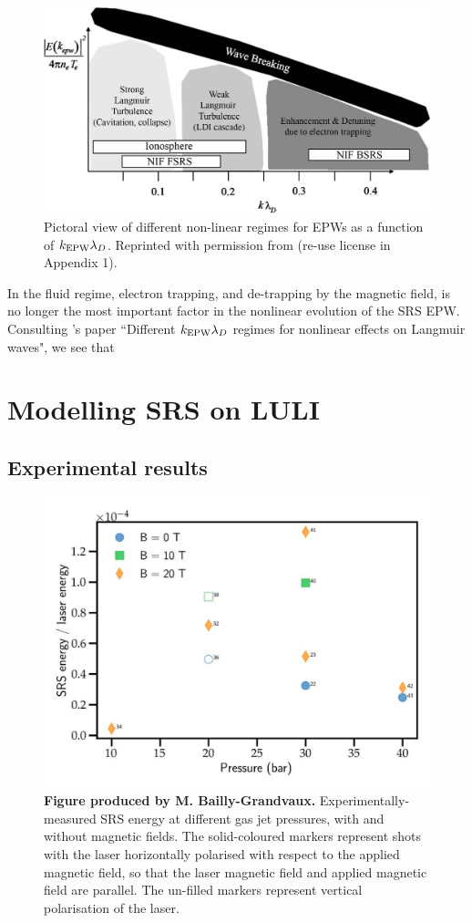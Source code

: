 \begin{figure}[ht]
   \centering
    \includegraphics[width=\columnwidth]{Chapters/C6_magSRS/kld_regimes.png}
    \caption{Pictoral view of different non-linear regimes for \acrshort{EPW}s as a function of $k_\mathrm{EPW}\lambda_D$. Reprinted with permission from \citet{Kline2006} (re-use license in Appendix 1).}
    \label{fig:Kline2006}
\end{figure}{}


In the fluid regime, electron trapping, and de-trapping by the magnetic field, is no longer the most important factor in the nonlinear evolution of the \acrshort{SRS} \acrshort{EPW}. Consulting \citet{Kline2006}'s paper ``Different $k_\mathrm{EPW}\lambda_D$ regimes for nonlinear effects on Langmuir waves", we see that 

\section{Modelling SRS on LULI}
\subsection{Experimental results}
\begin{figure}[ht]
   \centering
    \includegraphics[width=0.8\columnwidth]{Chapters/C6_magSRS/SRS_LULI.png}
    \caption{\textbf{Figure produced by M. Bailly-Grandvaux.} Experimentally-measured SRS energy at different gas jet pressures, with and without magnetic fields. The solid-coloured markers represent shots with the laser  horizontally polarised with respect to the applied magnetic field, so that the laser magnetic field and applied magnetic field are parallel. The un-filled markers represent vertical polarisation of the laser.}
    \label{fig:SRS_LULI}
\end{figure}{}


